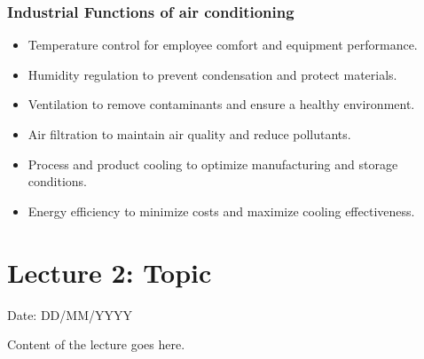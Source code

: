 \documentclass{article}
\begin{document}
\subsubsection*{Industrial Functions of air conditioning}
\begin{itemize}
  \item Temperature control for employee comfort and equipment performance.
  \item Humidity regulation to prevent condensation and protect materials.
  \item Ventilation to remove contaminants and ensure a healthy environment.
  \item Air filtration to maintain air quality and reduce pollutants.
  \item Process and product cooling to optimize manufacturing and storage conditions.
  \item Energy efficiency to minimize costs and maximize cooling effectiveness.
\end{itemize}

\newpage

\section{Lecture 2: Topic}
\hfill Date: DD/MM/YYYY

Content of the lecture goes here.
\end{document}
